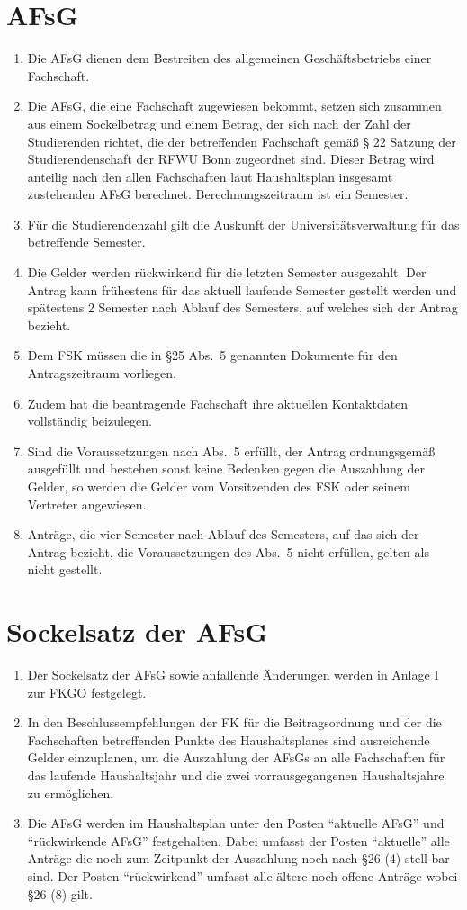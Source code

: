 \documentclass{article}
\begin{document}
\section{AFsG}
\begin{enumerate}[(1)]
    \item Die AFsG dienen dem Bestreiten des allgemeinen Geschäftsbetriebs einer Fachschaft.
    \item Die AFsG, die eine Fachschaft zugewiesen bekommt, setzen sich zusammen aus einem Sockelbetrag und einem Betrag, der sich nach der Zahl der Studierenden richtet, die der betreffenden Fachschaft gemäß § 22 Satzung der Studierendenschaft der RFWU Bonn zugeordnet sind. 
    	Dieser Betrag wird anteilig nach den allen Fachschaften laut Haushaltsplan insgesamt zustehenden AFsG berechnet. 
    	Berechnungszeitraum ist ein Semester.
    \item Für die Studierendenzahl gilt die Auskunft der Universitätsverwaltung für das betreffende Semester.
    \item Die Gelder werden rückwirkend für die letzten Semester ausgezahlt. 
    	Der Antrag kann frühestens für das aktuell laufende Semester gestellt werden und spätestens 2 Semester nach Ablauf des Semesters, auf welches sich der Antrag bezieht.
    \item Dem FSK müssen die in §25 Abs.\ 5 genannten Dokumente für den Antragszeitraum vorliegen.
    \item Zudem hat die beantragende Fachschaft ihre aktuellen Kontaktdaten vollständig beizulegen.
    \item Sind die Voraussetzungen nach Abs.\ 5 erfüllt, der Antrag ordnungsgemäß ausgefüllt und bestehen sonst keine Bedenken gegen die Auszahlung der Gelder, so werden die Gelder vom Vorsitzenden des FSK oder seinem Vertreter angewiesen.
    \item Anträge, die vier Semester nach Ablauf des Semesters, auf das sich der Antrag bezieht, die Voraussetzungen des Abs.\ 5 nicht erfüllen, gelten als nicht gestellt.
\end{enumerate}

\section{Sockelsatz der AFsG}
\begin{enumerate}[(1)]
    \item Der Sockelsatz der AFsG sowie anfallende Änderungen werden in Anlage I zur FKGO festgelegt.
    \item In den Beschlussempfehlungen der FK für die Beitragsordnung und der die Fachschaften betreffenden Punkte des Haushaltsplanes sind ausreichende Gelder einzuplanen, um die Auszahlung der AFsGs an alle Fachschaften für das laufende Haushaltsjahr und die zwei vorrausgegangenen Haushaltsjahre zu ermöglichen.
    \item Die AFsG werden im Haushaltsplan unter den Posten “aktuelle AFsG” und “rückwirkende AFsG” festgehalten. 
    	Dabei umfasst der Posten “aktuelle” alle Anträge die noch zum Zeitpunkt der Auszahlung noch nach §26 (4) stell bar sind. 
    	Der Posten “rückwirkend” umfasst alle ältere noch offene Anträge wobei §26 (8) gilt.
\end{enumerate}
\end{document}
